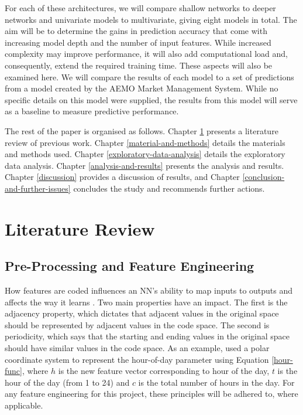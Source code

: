 \documentclass[mstat,12pt]{unswthesis}
\begin{document}
For each of these architectures, we will compare shallow networks to deeper networks and univariate models to multivariate, giving eight models in total. The aim will be to determine the gains in prediction accuracy that come with increasing model depth and the number of input features. While increased complexity may improve performance, it will also add computational load and, consequently, extend the required training time. These aspects will also be examined here. We will compare the results of each model to a set of predictions from a model created by the AEMO Market Management System. While no specific details on this model were supplied, the results from this model will serve as a baseline to measure predictive performance.

The rest of the paper is organised as follows. Chapter \ref{literature-review} presents a literature review of previous work. Chapter \ref{material-and-methods} details the materials and methods used. Chapter \ref{exploratory-data-analysis} details the exploratory data analysis. Chapter \ref{analysis-and-results} presents the analysis and results. Chapter \ref{discussion} provides a discussion of results, and Chapter \ref{conclusion-and-further-issues} concludes the study and recommends further actions.
\hypertarget{literature-review}{%
\chapter{Literature Review}\label{literature-review}}


\section{Pre-Processing and Feature Engineering} \label{Pre-Processing and Feature Engineering}
How features are coded influences an NN's ability to map inputs to outputs and affects the way it learns \cite{Dudek2019}. Two main properties have an impact. The first is the adjacency property, which dictates that adjacent values in the original space should be represented by adjacent values in the code space. The second is periodicity, which says that the starting and ending values in the original space should have similar values in the code space. As an example, \cite{Yazici2022} used a polar coordinate system to represent the hour-of-day parameter using Equation \ref{hour-func}, where $h$ is the new feature vector corresponding to hour of the day, $t$ is the hour of the day (from 1 to 24) and $c$ is the total number of hours in the day. For any feature engineering for this project, these principles will be adhered to, where applicable.
\end{document}
